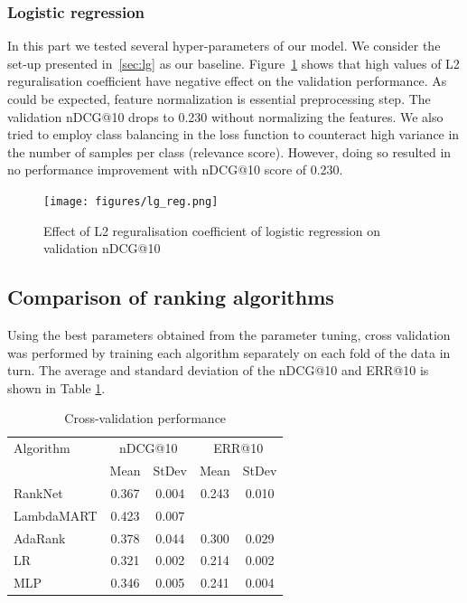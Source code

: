 \documentclass[english]{article}
\theoremstyle{definition}
\begin{document}
\begin{multicols}{2}
\subsubsection{Logistic regression} \label{sec:param_tune_lg}
In this part we tested several hyper-parameters of our model. We consider the set-up presented in~\ref{sec:lg} as our baseline. Figure~\ref{fig:lg_reg} shows that high values of L2 reguralisation coefficient have negative effect on the validation performance. As could be expected, feature normalization is essential preprocessing step. The validation nDCG@10 drops to 0.230 without normalizing the features. We also tried to employ class balancing in the loss function to counteract high variance in the number of samples per class (relevance score). However, doing so resulted in no performance improvement with nDCG@10 score of 0.230.

\begin{figure}[H]
\texttt{[image: figures/lg\_reg.png]}
\caption{Effect of L2 reguralisation coefficient of logistic regression on validation nDCG@10} \label{fig:lg_reg}
\end{figure}

\subsection{Comparison of ranking algorithms}

Using the best parameters obtained from the parameter tuning, cross validation was performed by training each algorithm separately on each fold of the data in turn.  The average and standard deviation of the nDCG@10 and ERR@10 is shown in Table \ref{tab:CV}.
\begin{table}[H]
\begin{center}
\begin{tabular}{l c c c c}
  \hline
   Algorithm & \multicolumn{2}{c}{nDCG@10} & \multicolumn{2}{c}{ERR@10}\\
  {} & Mean & StDev & Mean & StDev \\
  \hline
  RankNet & 0.367 & 0.004 & 0.243 & 0.010 \\
  LambdaMART & 0.423 & 0.007 &  &  \\
  AdaRank & 0.378 & 0.044 & 0.300 & 0.029 \\
  LR & 0.321 & 0.002 & 0.214 & 0.002 \\
  MLP & 0.346 & 0.005 & 0.241 & 0.004  \\
  \hline
\end{tabular}
\caption{\label{tab:CV}Cross-validation performance}
\end{center}
\end{table}


\end{multicols}
\end{document}
